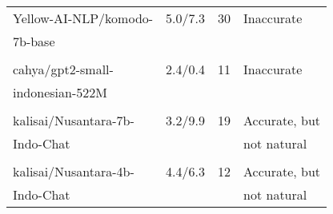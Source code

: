 \begin{table}[!htbp]
\begin{tabular}{llll}
    \\
    Yellow-AI-NLP/komodo-     & 5.0/7.3   &30    & Inaccurate \\
    7b-base \cite{owen2024komodo}                  &          &           &  \\
    \\
    cahya/gpt2-small-         & 2.4/0.4   &11    & Inaccurate \\
    indonesian-522M \cite{cahya_llm}          &          &           &  \\
    \\
    kalisai/Nusantara-7b-     & 3.2/9.9   &19    & Accurate, but \\
    Indo-Chat \cite{zulfikar_aji_kusworo_2024}        &          &           & not natural \\
    \\
    kalisai/Nusantara-4b-     & 4.4/6.3   &12    & Accurate, but \\
    Indo-Chat  \cite{zulfikar_aji_kusworo_2024}               &          &           & not natural \\
    \bottomrule
  \end{tabular}
\end{table}


